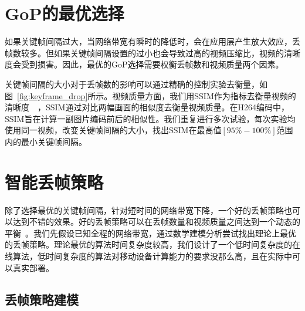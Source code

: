 \section{GoP的最优选择}
如果关键帧间隔过大，当网络带宽有瞬时的降低时，会在应用层产生放大效应，丢帧数较多。但如果关键帧间隔设置的过小也会导致过高的视频压缩比，视频的清晰度会受到损害。因此，最优的GoP选择需要权衡丢帧数和视频质量两个因素。

关键帧间隔的大小对于丢帧数的影响可以通过精确的控制实验去衡量，如图~\ref{fig:keyframe_drop}所示。视频质量方面，我们用SSIM作为指标去衡量视频的清晰度~\cite{hore2010image}~\cite{shea2013cloud}，SSIM通过对比两幅画面的相似度去衡量视频质量。在H264编码中，SSIM旨在计算一副图片编码前后的相似性。我们重复进行多次试验，每次实验均使用同一视频，改变关键帧间隔的大小，找出SSIM在最高值$[95\%-100\%]$范围内的最小关键帧间隔。

\section{智能丢帧策略}
除了选择最优的关键帧间隔，针对短时间的网络带宽下降，一个好的丢帧策略也可以达到不错的效果。好的丢帧策略可以在丢帧数量和视频质量之间达到一个动态的平衡~\cite{fouladi2018salsify}。我们先假设已知全程的网络带宽，通过数学建模分析尝试找出理论上最优的丢帧策略。理论最优的算法时间复杂度较高，我们设计了一个低时间复杂度的在线算法，低时间复杂度的算法对移动设备计算能力的要求没那么高，且在实际中可以真实部署。

\subsection{丢帧策略建模}

